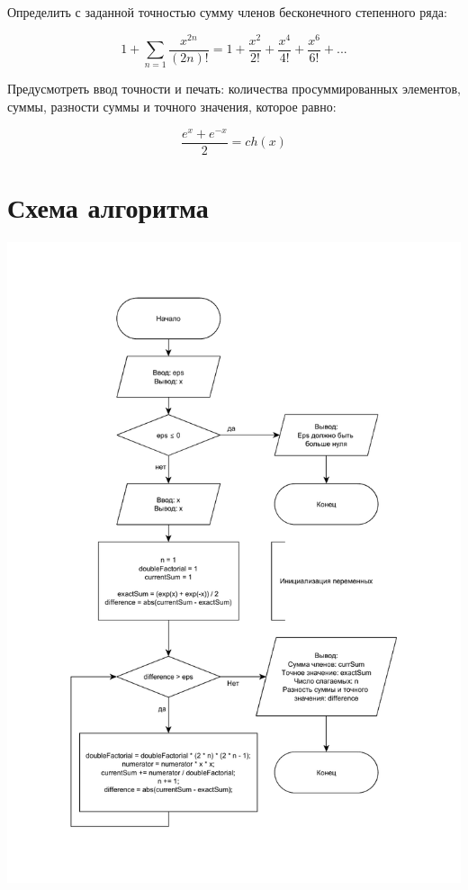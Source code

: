 \documentclass[a4paper]{article}
\begin{document}
	Определить с заданной точностью сумму членов бесконечного степенного ряда:
	
	$$ 1 + \displaystyle\sum_{n=1} \frac{x^{2n}}{(2n)!} = 1 + \frac{x^{2}}{2!} + \frac{x^{4}}{4!} + \frac{x^{6}}{6!} + ... $$
	
	Предусмотреть ввод точности и печать: количества просуммированных элементов, суммы, разности суммы и точного значения, которое равно:
	
	$$ \frac{e^{x} + e^{-x}}{2} = ch(x) $$
	
	\newpage
	
	\section{Схема алгоритма}
	
	\begin{center}
		\includegraphics[width=\textwidth]{printed.pdf}
	\end{center}
	
\end{document}
